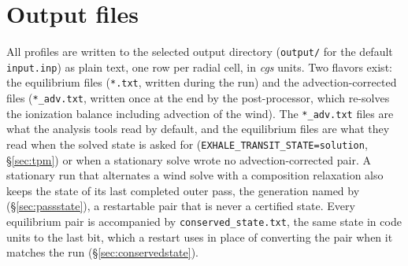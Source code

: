\documentclass[english,a4paper]{my_memo}
\begin{document}
\section{Output files}\label{sec:outputs}
All profiles are written to the selected output directory (\texttt{output/}
for the default \texttt{input.inp}) as plain text, one row per radial
cell, in \emph{cgs} units. Two flavors exist: the equilibrium files
(\texttt{*.txt}, written during the run) and the advection-corrected files
(\texttt{*\_adv.txt}, written once at the end by the post-processor, which
re-solves the ionization balance including advection of the wind). The
\texttt{*\_adv.txt} files are what the analysis tools read by default, and
the equilibrium files are what they read when the solved state is asked for
(\texttt{EXHALE\_TRANSIT\_STATE=solution}, \S\ref{sec:tpm}) or when a
stationary solve wrote no advection-corrected pair. A stationary run that
alternates a wind solve with a composition relaxation also keeps the state of
its last completed outer pass, the generation
 named by 
(\S\ref{sec:passstate}), a restartable pair that is never a certified state.
Every equilibrium pair is accompanied by \texttt{conserved\_state.txt}, the
same state in code units to the last bit, which a restart uses in place of
converting the pair when it matches the run (\S\ref{sec:conservedstate}).
\end{document}
